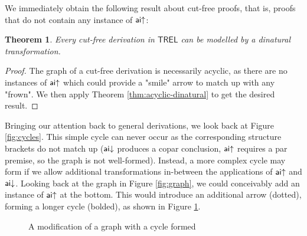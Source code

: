 \documentclass[11pt, oneside]{article}
\theoremstyle{plain}
\newtheorem{theorem}{Theorem}[section]
\theoremstyle{definition}
\newcommand{\sSys}{{\mathsf{TREL}}}%
\begin{document}
We immediately obtain the following result about cut-free proofs, that is, proofs that do not contain any instance of ${\mathsf {ai}}{ \uparrow}$:

\begin{theorem}
Every cut-free derivation in $\sSys$ can be modelled by a dinatural transformation.
\end{theorem}

\begin{proof}
The graph of a cut-free derivation is necessarily acyclic, as there are no instances of ${\mathsf {ai}}{ \uparrow}$ which could provide a "smile" arrow to match up with any "frown".
We then apply Theorem \ref{thm:acyclic-dinatural} to get the desired result.
\end{proof}

Bringing our attention back to general derivations, we look back at Figure \ref{fig:cycles}.
This simple cycle can never occur as the corresponding structure brackets do not match up (${\mathsf {ai}}{\downarrow}$ produces a copar conclusion, ${\mathsf {ai}}{ \uparrow}$ requires a par premise, so the graph is not well-formed).
Instead, a more complex cycle may form if we allow additional transformations in-between the applications of ${\mathsf {ai}}{ \uparrow}$ and ${\mathsf {ai}}{\downarrow}$.
Looking back at the graph in Figure \ref{fig:graph}, we could conceivably add an instance of ${\mathsf {ai}}{ \uparrow}$ at the bottom.
This would introduce an additional arrow (dotted), forming a longer cycle (bolded), as shown in Figure \ref{fig:modification}.

\begin{figure}[ht]
\centering
{}

\caption{A modification of a graph with a cycle formed}
\label{fig:modification}
\end{figure}
\end{document}

